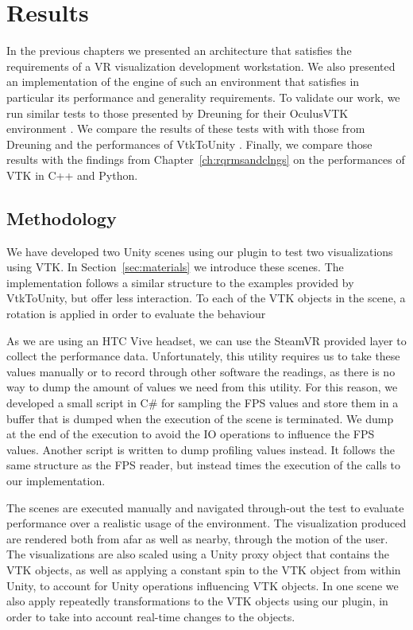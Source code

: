 \chapter{Results}
\label{ch:results}

In the previous chapters we presented an architecture that satisfies the requirements of a VR visualization development workstation. We also presented an implementation of the engine of such an environment that satisfies in particular its performance and generality requirements. To validate our work, we run similar tests to those presented by Dreuning for their OculusVTK environment \cite{dreuning_visual_2016}. We compare the results of these tests with with those from Dreuning and the performances of VtkToUnity \cite{wheeler_virtual_2018}. Finally, we compare those results with the findings from Chapter~\ref{ch:rqrmsandclngs} on the performances of VTK in C++ and Python.

\section{Methodology}

We have developed two Unity scenes using our plugin to test two visualizations using VTK. In Section~\ref{sec:materials} we introduce these scenes. The implementation follows a similar structure to the examples provided by VtkToUnity, but offer less interaction. To each of the VTK objects in the scene, a rotation is applied in order to evaluate the behaviour 

As we are using an HTC Vive headset, we can use the SteamVR provided layer to collect the performance data. Unfortunately, this utility requires us to take these values manually or to record through other software the readings, as there is no way to dump the amount of values we need from this utility. For this reason, we developed a small script in C\# for sampling the FPS values and store them in a buffer that is dumped when the execution of the scene is terminated. We dump at the end of the execution to avoid the IO operations to influence the FPS values. Another script is written to dump profiling values instead. It follows the same structure as the FPS reader, but instead times the execution of the calls to our implementation. 

The scenes are executed manually and navigated through-out the test to evaluate performance over a realistic usage of the environment. The visualization produced are rendered both from afar as well as nearby, through the motion of the user. The visualizations are also scaled using a Unity proxy object that contains the VTK objects, as well as applying a constant spin to the VTK object from within Unity, to account for Unity operations influencing VTK objects. In one scene we also apply repeatedly transformations to the VTK objects using our plugin, in order to take into account real-time changes to the objects.

